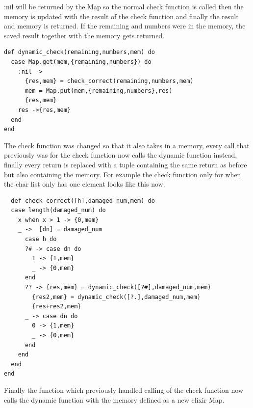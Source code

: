 \documentclass[a4paper,11pt]{article}
\begin{document}
:nil will be returned by the Map so the normal check function is called then the memory is updated with the result of the check function and finally the result and memory is returned. If the remaining and numbers were in the memory, the saved result together with the memory gets returned. 
\begin{verbatim}
def dynamic_check(remaining,numbers,mem) do
  case Map.get(mem,{remaining,numbers}) do
    :nil ->
      {res,mem} = check_correct(remaining,numbers,mem)
      mem = Map.put(mem,{remaining,numbers},res)
      {res,mem}
    res ->{res,mem}
  end
end
\end{verbatim}
The check function was changed so that it also takes in a memory, every call that previously was for the check function now calls the dynamic function instead, finally every return is replaced with a tuple containing the same return as before but also containing the memory. For example the check function only for when the char list only has one element looks like this now. 
\begin{verbatim}
  def check_correct([h],damaged_num,mem) do
  case length(damaged_num) do
    x when x > 1 -> {0,mem}
    _ ->  [dn] = damaged_num
      case h do
      ?# -> case dn do
        1 -> {1,mem}
        _ -> {0,mem}
      end
      ?? -> {res,mem} = dynamic_check([?#],damaged_num,mem)
        {res2,mem} = dynamic_check([?.],damaged_num,mem)
        {res+res2,mem}
      _ -> case dn do
        0 -> {1,mem}
        _ -> {0,mem}
      end
    end
  end
end
\end{verbatim}
Finally the function which previously handled calling of the check function now calls the dynamic function with the memory defined as a new 
elixir Map.
\end{document}
